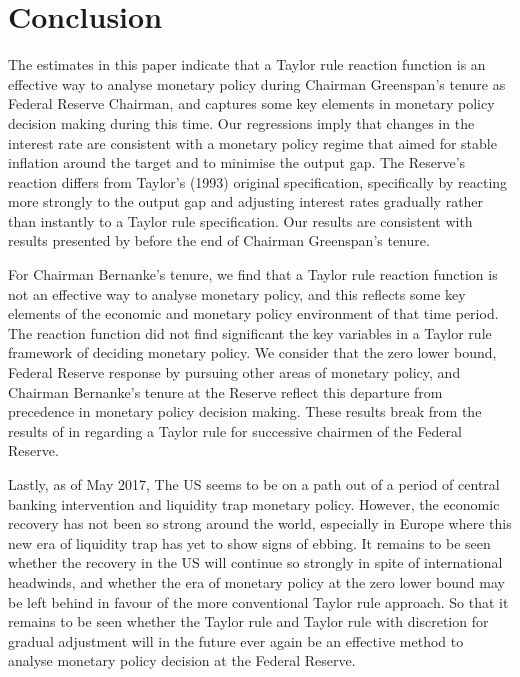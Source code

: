 \documentclass[notitlepage,12pt]{article}
\begin{document}
\section{Conclusion}
The estimates in this paper indicate that a Taylor rule reaction function is an effective way to analyse monetary policy during Chairman Greenspan's tenure as Federal Reserve Chairman, and captures some key elements in monetary policy decision making during this time.  Our regressions imply that changes in the interest rate are consistent with a monetary policy regime that aimed for stable inflation around the target and to minimise the output gap.  The Reserve's reaction differs from Taylor's (1993) original specification, specifically by reacting more strongly to the output gap and adjusting interest rates gradually rather than instantly to a Taylor rule specification.  Our results are consistent with results presented by \cite{judd1998taylor} before the end of Chairman Greenspan's tenure.

For Chairman Bernanke's tenure, we find that a Taylor rule reaction function is not an effective way to analyse monetary policy, and this reflects some key elements of the economic and monetary policy environment of that time period.  The reaction function did not find significant the key variables in a Taylor rule framework of deciding monetary policy.  We consider that the zero lower bound, Federal Reserve response by pursuing other areas of monetary policy, and Chairman Bernanke's tenure at the Reserve reflect this departure from precedence in monetary policy decision making.  These results break from the results of \cite{judd1998taylor} in regarding a Taylor rule for successive chairmen of the Federal Reserve.

Lastly, as of May 2017, The US seems to be on a path out of a period of central banking intervention and liquidity trap monetary policy.  However, the economic recovery has not been so strong around the world, especially in Europe where this new era of liquidity trap has yet to show signs of ebbing.  It remains to be seen whether the recovery in the US will continue so strongly in spite of international headwinds, and whether the era of monetary policy at the zero lower bound may be left behind in favour of the more conventional Taylor rule approach.  So that it remains to be seen whether the Taylor rule and Taylor rule with discretion for gradual adjustment will in the future ever again be an effective method to analyse monetary policy decision at the Federal Reserve.
\newpage


\end{document}
